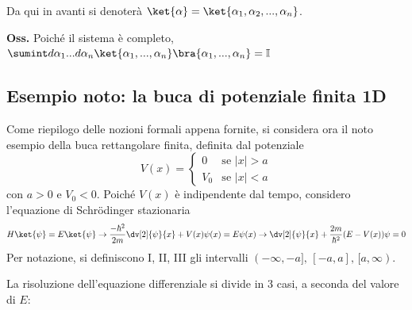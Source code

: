 Da qui in avanti si denoterà $ \ket{\alpha} = \ket{\alpha_1,\alpha_2,...,\alpha_n}$.

\textbf{Oss.} Poiché il sistema è completo,
$\sumint d\alpha_1...d\alpha_n \ket{\alpha_1,...,\alpha_n}\bra{\alpha_1,...,\alpha_n} =\mathbb{I}$

\subsection{Esempio noto: la buca di potenziale finita 1D}
Come riepilogo delle nozioni formali appena fornite, si considera ora il noto esempio della
buca rettangolare finita, definita dal potenziale
$$
V(x) = \begin{cases}
 0   & \text{se } |x| > a \\
 V_0   & \text{se } |x| < a
\end{cases}
$$
con $ a>0 $ e $ V_0 < 0 $. Poiché $ V(x) $ è indipendente dal tempo, considero l'equazione
di Schrödinger stazionaria
$$ H\ket{\psi} = E\ket{\psi} \to \frac{-\hbar^2}{2m}\dv[2]{\psi}{x} + V(x)\psi(x)= E\psi(x)
    \to \dv[2]{\psi}{x} + \frac{2m}{\hbar^2}(E-V(x))\psi = 0
$$ 
Per notazione, si definiscono I, II, III gli intervalli $ (-\infty,-a],\,[-a,a],\,[a,\infty)$. 

La risoluzione dell'equazione differenziale si divide in 3 casi, a seconda del valore di $E$:

